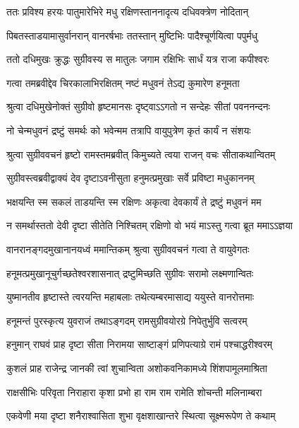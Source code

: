 \twolineshloka
{ततः प्रविश्य हरयः पातुमारेभिरे मधु}
{रक्षिणस्ताननादृत्य दधिवक्त्रेण नोदितान्} %

\twolineshloka
{पिबतस्ताडयामासुर्वानरान् वानरर्षभाः}
{ततस्तान् मुष्टिभिः पादैश्चूर्णयित्वा पपुर्मधु} %

\twolineshloka
{ततो दधिमुखः क्रुद्धः सुग्रीवस्य स मातुलः}
{जगाम रक्षिभिः सार्धं यत्र राजा कपीश्वरः} %

\twolineshloka
{गत्वा तमब्रवीद्देव चिरकालाभिरक्षितम्}
{नष्टं मधुवनं तेऽद्य कुमारेण हनूमता} %

\twolineshloka
{श्रुत्वा दधिमुखेनोक्तं सुग्रीवो हृष्टमानसः}
{दृष्ट्वाऽऽगतो न सन्देहः सीतां पवननन्दनः} %

\twolineshloka
{नो चेन्मधुवनं द्रष्टुं समर्थः को भवेन्मम}
{तत्रापि वायुपुत्रेण कृतं कार्यं न संशयः} %

\twolineshloka
{श्रुत्वा सुग्रीववचनं हृष्टो रामस्तमब्रवीत्}
{किमुच्यते त्वया राजन् वचः सीताकथान्वितम्} %

\twolineshloka
{सुग्रीवस्त्वब्रवीद्वाक्यं देव दृष्टाऽवनीसुता}
{हनुमत्प्रमुखाः सर्वे प्रविष्टा मधुकाननम्} %

\twolineshloka
{भक्षयन्ति स्म सकलं ताडयन्ति स्म रक्षिणः}
{अकृत्वा देवकार्यं ते द्रष्टुं मधुवनं मम} %

\twolineshloka
{न समर्थास्ततो देवी दृष्टा सीतेति निश्चितम्}
{रक्षिणो वो भयं माऽस्तु गत्वा ब्रूत ममाऽऽज्ञया} %

\twolineshloka
{वानरानङ्गदमुखानानयध्वं ममान्तिकम्}
{श्रुत्वा सुग्रीववचनं गत्वा ते वायुवेगतः} %

\twolineshloka
{हनूमत्प्रमुखानूचुर्गच्छतेश्वरशासनात्}
{द्रष्टुमिच्छति सुग्रीवः सरामो लक्ष्मणान्वितः} %

\twolineshloka
{युष्मानतीव हृष्टास्ते त्वरयन्ति महाबलाः}
{तथेत्यम्बरमासाद्य ययुस्ते वानरोत्तमाः} %

\twolineshloka
{हनूमन्तं पुरस्कृत्य युवराजं तथाऽङ्गदम्}
{रामसुग्रीवयोरग्रे निपेतुर्भुवि सत्वरम्} %

\twolineshloka
{हनुमान् राघवं प्राह दृष्टा सीता निरामया}
{साष्टाङ्गं प्रणिपत्याग्रे रामं पश्चाद्धरीश्वरम्} %

\twolineshloka
{कुशलं प्राह राजेन्द्र जानकी त्वां शुचान्विता}
{अशोकवनिकामध्ये शिंशपामूलमाश्रिता} %

\twolineshloka
{राक्षसीभिः परिवृता निराहारा कृशा प्रभो}
{हा राम राम रामेति शोचन्ती मलिनाम्बरा} %

\twolineshloka
{एकवेणी मया दृष्टा शनैराश्वासिता शुभा}
{वृक्षशाखान्तरे स्थित्वा सूक्ष्मरूपेण ते कथाम्} %

